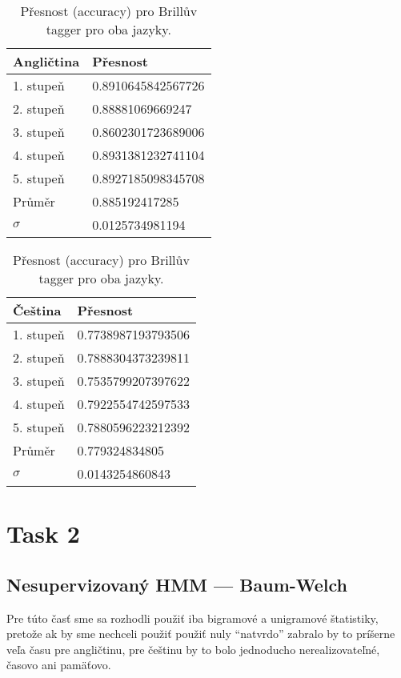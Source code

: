 \documentclass[a4paper, 10.5pt]{article}
\begin{document}
\begin{table}[H]
\centering
\begin{tabular}{ll}
\toprule
\textbf{Angličtina} & \textbf{Přesnost} \\
\midrule
1. stupeň & 0.8910645842567726 \\
2. stupeň & 0.88881069669247 \\
3. stupeň & 0.8602301723689006 \\
4. stupeň & 0.8931381232741104 \\
5. stupeň & 0.8927185098345708 \\
\midrule
Průměr   & 0.885192417285 \\
$\sigma$ & 0.0125734981194 \\
\bottomrule
\end{tabular}
\hskip 50pt
\begin{tabular}{ll}
\toprule
\textbf {Čeština} & \textbf{Přesnost} \\
\midrule
1. stupeň & 0.7738987193793506 \\
2. stupeň & 0.7888304373239811 \\
3. stupeň & 0.7535799207397622 \\
4. stupeň & 0.7922554742597533 \\
5. stupeň & 0.7880596223212392 \\
\midrule
Průměr   & 0.779324834805 \\
$\sigma$ & 0.0143254860843 \\
\bottomrule
\end{tabular}
\caption{Přesnost (accuracy) pro Brillův tagger pro oba jazyky.}
\label{eng_big}
\end{table}

\section*{Task 2}

\subsection*{Nesupervizovaný HMM --- Baum-Welch}

Pre túto časť sme sa rozhodli použiť iba bigramové a unigramové štatistiky, pretože ak by sme nechceli použiť použiť nuly ``natvrdo'' zabralo by to príšerne veľa času pre angličtinu, pre češtinu by to bolo jednoducho nerealizovateľné, časovo ani pamäťovo.
\end{document}
